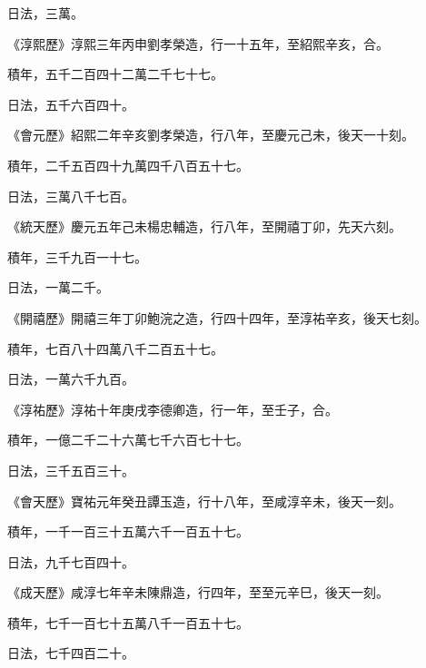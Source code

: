 \begin{pinyinscope}
 日法，三萬。



 《淳熙歷》淳熙三年丙申劉孝榮造，行一十五年，至紹熙辛亥，合。



 積年，五千二百四十二萬二千七十七。



 日法，五千六百四十。



 《會元歷》紹熙二年辛亥劉孝榮造，行八年，至慶元己未，後天一十刻。



 積年，二千五百四十九萬四千八百五十七。



 日法，三萬八千七百。



 《統天歷》慶元五年己未楊忠輔造，行八年，至開禧丁卯，先天六刻。



 積年，三千九百一十七。



 日法，一萬二千。



 《開禧歷》開禧三年丁卯鮑浣之造，行四十四年，至淳祐辛亥，後天七刻。



 積年，七百八十四萬八千二百五十七。



 日法，一萬六千九百。



 《淳祐歷》淳祐十年庚戌李德卿造，行一年，至壬子，合。



 積年，一億二千二十六萬七千六百七十七。



 日法，三千五百三十。



 《會天歷》寶祐元年癸丑譚玉造，行十八年，至咸淳辛未，後天一刻。



 積年，一千一百三十五萬六千一百五十七。



 日法，九千七百四十。



 《成天歷》咸淳七年辛未陳鼎造，行四年，至至元辛巳，後天一刻。



 積年，七千一百七十五萬八千一百五十七。



 日法，七千四百二十。




\end{pinyinscope}
